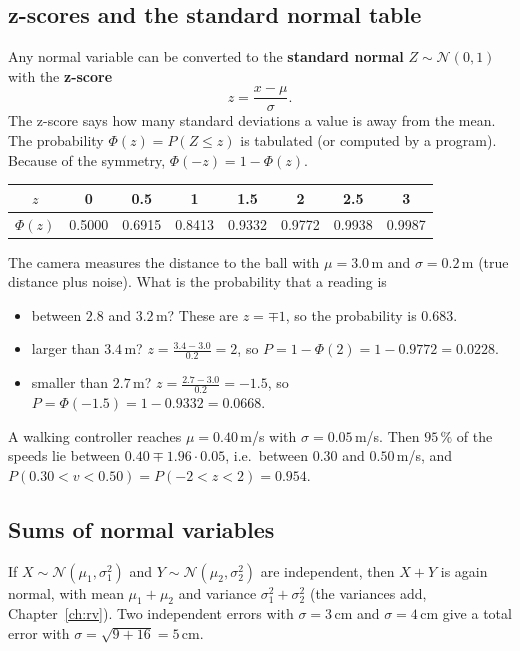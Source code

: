 \subsection*{z-scores and the standard normal table}
Any normal variable can be converted to the \textbf{standard normal} $Z\sim\mathcal N(0,1)$ with the \textbf{z-score}
\[
z=\frac{x-\mu}{\sigma}.
\]
The z-score says how many standard deviations a value is away from the mean. The probability $\Phi(z)=P(Z\le z)$ is tabulated (or computed by a program). Because of the symmetry, $\Phi(-z)=1-\Phi(z)$.
\begin{center}
\renewcommand{\arraystretch}{1.2}
\begin{tabular}{c|ccccccc}
$z$ & 0 & 0.5 & 1 & 1.5 & 2 & 2.5 & 3\\ \hline
$\Phi(z)$ & 0.5000 & 0.6915 & 0.8413 & 0.9332 & 0.9772 & 0.9938 & 0.9987
\end{tabular}
\end{center}

\begin{example}
The camera measures the distance to the ball with $\mu=3.0$\,m and $\sigma=0.2$\,m (true distance plus noise). What is the probability that a reading is
\begin{itemize}[nosep]
  \item between $2.8$ and $3.2$\,m? These are $z=\mp1$, so the probability is $0.683$.
  \item larger than $3.4$\,m? $z=\frac{3.4-3.0}{0.2}=2$, so $P=1-\Phi(2)=1-0.9772=0.0228$.
  \item smaller than $2.7$\,m? $z=\frac{2.7-3.0}{0.2}=-1.5$, so $P=\Phi(-1.5)=1-0.9332=0.0668$.
\end{itemize}
\end{example}

\begin{example}
A walking controller reaches $\mu=0.40$\,m/s with $\sigma=0.05$\,m/s. Then $95\,\%$ of the speeds lie between $0.40\mp1.96\cdot0.05$, i.e.\ between $0.30$ and $0.50$\,m/s, and $P(0.30<v<0.50)=P(-2<z<2)=0.954$.
\end{example}

\subsection*{Sums of normal variables}
If $X\sim\mathcal N(\mu_1,\sigma_1^2)$ and $Y\sim\mathcal N(\mu_2,\sigma_2^2)$ are independent, then $X+Y$ is again normal, with mean $\mu_1+\mu_2$ and variance $\sigma_1^2+\sigma_2^2$ (the variances add, Chapter~\ref{ch:rv}). Two independent errors with $\sigma=3$\,cm and $\sigma=4$\,cm give a total error with $\sigma=\sqrt{9+16}=5$\,cm.

